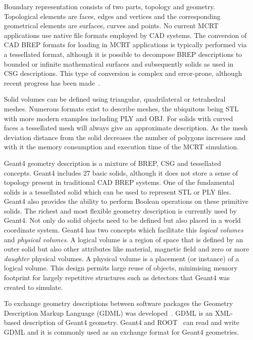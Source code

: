 \documentclass[final,5p,times,twocolumn]{elsarticle}
\begin{document}
Boundary representation consists of two parts, topology and geometry. Topological elements are faces, edges and vertices and the corresponding
geometrical elements are surfaces, curves and points. No current MCRT applications use native file formats employed by CAD systems. The conversion of 
CAD BREP formats for loading in MCRT applications is typically performed via a tessellated format, although it is possible to decompose BREP descriptions
 to bounded or infinite mathematical surfaces and subsequently solids as used in CSG descriptions. This type of conversion is complex and error-prone, 
 although recent progress has been made~\cite{WangNuclSciTech31-82-2020}.

Solid volumes can be defined using triangular, quadrilateral or tetrahedral meshes. Numerous formats exist to describe meshes, the ubiquitous being STL with
more modern examples including PLY and OBJ. For solids with curved faces a tessellated mesh will always give an approximate description. As the mesh 
deviation distance from the solid decreases the number of polygons increases and with it the memory consumption and execution time of the MCRT simulation. 

Geant4 geometry description is a mixture of BREP, CSG and tessellated concepts. Geant4 includes 27 basic solids, although it does not store a sense 
of topology present in traditional CAD BREP systems. One of the fundamental solids is a tessellated solid which can be used to represent STL or PLY files. 
Geant4 also provides the ability to perform Boolean operations on these primitive solids. The richest and most flexible geometry description is currently used by
Geant4. Not only do solid objects need to be defined but also placed in a world coordinate system. Geant4 has two concepts which facilitate this \emph{logical volumes}
and \emph{physical volumes}. A logical volume is a region of space that is defined by an outer solid but also other attributes like material, magnetic field 
and zero or more \emph{daughter} physical volumes. A physical volume is a placement (or instance) of a logical volume. This design permits large reuse 
of objects, minimising memory footprint for largely repetitive structures such as detectors that Geant4 was created to simulate.  


To exchange geometry descriptions between software packages the Geometry Description Markup Language (GDML) was developed~\cite{GDML}. 
GDML is an XML-based description of Geant4 geometry. Geant4 and ROOT~\cite{fons_rademakers_2019_3895860} can read and write 
GDML and it is commonly used as an exchange format for Geant4 geometries. 
\end{document}

